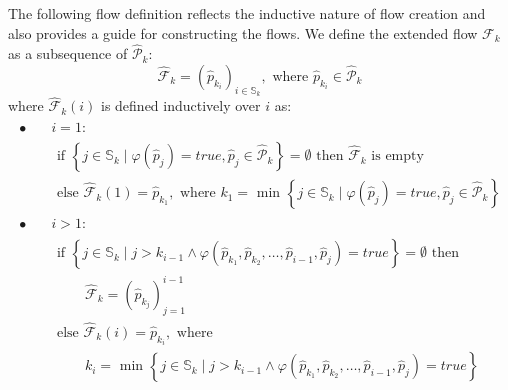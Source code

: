 The following flow definition reflects the inductive nature of flow creation and also provides a guide for constructing the flows. We define the extended flow $\mathcal{F}_k$ as a subsequence of $\widehat{\mathcal{P}}_k$:
\begin{equation}
\widehat{\mathcal{F}}_k = (\widehat{p}_{k_i})_{i \in \mathbb{S}_k}, \mbox{ where } \widehat{p}_{k_i} \in \widehat{\mathcal{P}}_k
\end{equation}
where $\widehat{\mathcal{F}}_k(i)$ is defined inductively over $i$ as:
\begin{align}
\begin{split}
\bullet\quad &i = 1: \\
	&\begin{array}{l}
		\mbox{if } \left\{ j \in \mathbb{S}_k \mid \varphi(\widehat{p}_j) = true, \widehat{p}_j \in \widehat{\mathcal{P}}_k \right\} = \emptyset \mbox{ then } \widehat{\mathcal{F}}_k \mbox{ is empty} \\
		\mbox{else } \widehat{\mathcal{F}}_k(1) = \widehat{p}_{k_1}, \mbox{ where } k_1 = \mbox{ min }\left\{ j \in \mathbb{S}_k \mid \varphi(\widehat{p}_j) = true, \widehat{p}_j \in \widehat{\mathcal{P}}_k \right\}
	\end{array}\\
\bullet\quad &i > 1: \\
	&\begin{array}{l}
		\mbox{if } \left\{ j \in \mathbb{S}_k \mid j > k_{i-1} \land \varphi(\widehat{p}_{k_1}, \widehat{p}_{k_2}, \ldots, \widehat{p}_{i-1}, \widehat{p}_j) = true \right\} = \emptyset \mbox{ then } \\
		\qquad \widehat{\mathcal{F}}_k = (\widehat{p}_{k_j})_{j=1}^{i-1} \\
		\mbox{else } \widehat{\mathcal{F}}_k(i) = \widehat{p}_{k_i}, \mbox{ where } \\
		\qquad k_i = \mbox{ min }\left\{ j \in \mathbb{S}_k \mid j > k_{i-1} \land \varphi(\widehat{p}_{k_1}, \widehat{p}_{k_2}, \ldots, \widehat{p}_{i-1}, \widehat{p}_j) = true \right\}
	\end{array}
\end{split}
\end{align}


